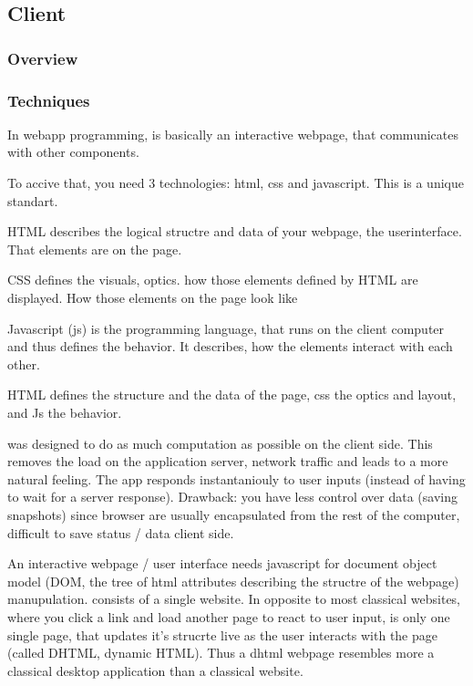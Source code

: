 \subsection{Client}
\label{sec:client}

\subsubsection{Overview}
\label{sec:client_overview}


\subsubsection{Techniques}
\label{sec:client_techniques}



In webapp programming, is basically an interactive webpage, that communicates with other components.

To accive that, you need 3 technologies: html, css and javascript. This is a unique standart.

HTML describes the logical structre and data of your webpage, the userinterface. That elements are on the page.

CSS defines the visuals, optics. how those elements defined by HTML are displayed. How those elements on the page look like

Javascript (js) is the programming language, that runs on the client computer and thus defines the behavior. It describes, how the elements interact with each other.

HTML defines the structure and the data of the page, css the optics and layout, and Js the behavior.


\spl was designed to do as much computation as possible on the client side.
This removes the load on the application server, network traffic and leads to a more natural feeling.
The app responds instantaniouly to user inputs (instead of having to wait for a server response).
Drawback: you have less control over data (saving snapshots) since browser are usually encapsulated from the rest of the computer, difficult to save status / data client side.


An interactive webpage / user interface needs javascript for document object model (DOM, the tree of html attributes describing the structre of the webpage) manupulation.
\spl consists of a single website.
In opposite to most classical websites, where you click a link and load another page to react to user input, \spl is only one single page, that updates it's strucrte live as the user interacts with the page (called DHTML, dynamic HTML).
Thus a dhtml webpage resembles more a classical desktop application than a classical website.

